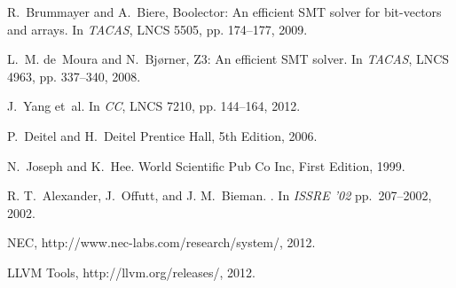 \documentclass[a4paper]{llncs}
\begin{document}
{\begin{thebibliography}{10}
R.~Brummayer and A.~Biere, Boolector: An efficient {SMT} solver for  bit-vectors and arrays.
\newblock In {\em TACAS}, LNCS 5505, pp. 174--177, 2009.

L.~M. de~Moura and N.~Bj{\o}rner, Z3: An efficient {SMT} solver.
\newblock In {\em  TACAS}, LNCS 4963, pp. 337--340, 2008.

J.~Yang et~al.
\newblock In {\em CC}, LNCS 7210, pp. 144--164, 2012.

P.~Deitel and H.~Deitel
\newblock Prentice Hall, 5th Edition, 2006.

N.~Joseph and K.~Hee.
\newblock World Scientific Pub Co Inc, First Edition, 1999.

R. T.~Alexander, J.~Offutt, and J. M.~Bieman. .
\newblock In {\em ISSRE '02} pp.~207--2002, 2002.

NEC, http://www.nec-labs.com/research/system/, 2012.

LLVM Tools, http://llvm.org/releases/, 2012.

\end{thebibliography}}
\end{document}

